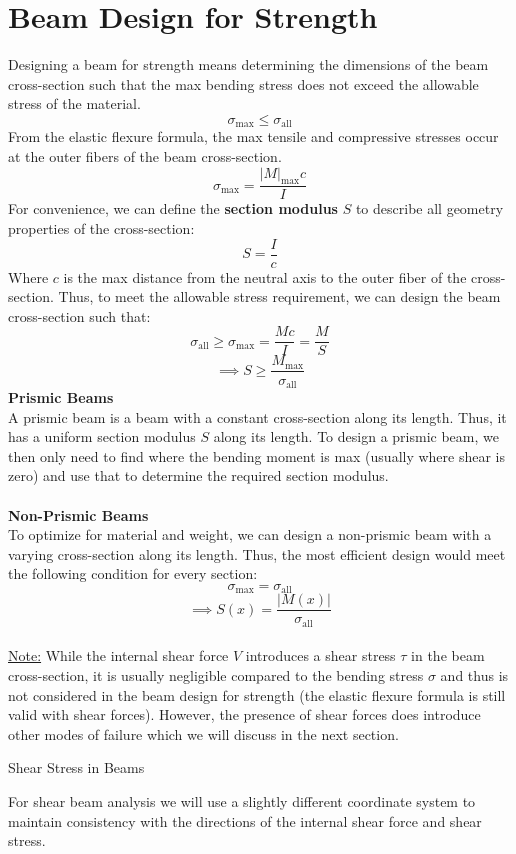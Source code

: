 \documentclass[12pt]{article}
\begin{document}
\section*{Beam Design for Strength}
Designing a beam for strength means determining the dimensions of the beam cross-section such that the max bending stress does not exceed the allowable stress of the material.
\[\sigma_\text{max}\leq\sigma_\text{all}\]
From the elastic flexure formula, the max tensile and compressive stresses occur at the outer fibers of the beam cross-section. 
\[\sigma_\text{max} = \frac{|M|_\text{max} c}{I}\]
For convenience, we can define the \textbf{section modulus} $S$ to describe all geometry properties of the cross-section:
\[\boxed{S = \frac{I}{c}}\]
Where $c$ is the max distance from the neutral axis to the outer fiber of the cross-section. Thus, to meet the allowable stress requirement, we can design the beam cross-section such that:
\[\sigma_\text{all} \geq \sigma_\text{max} = \frac{Mc}{I} = \frac{M}{S}\]
\[\implies S \geq \frac{M_\text{max}}{\sigma_\text{all}}\]
\textbf{Prismic Beams}\\
A prismic beam is a beam with a constant cross-section along its length. Thus, it has a uniform section modulus $S$ along its length. To design a prismic beam, we then only need to find where the bending moment is max (usually where shear is zero) and use that to determine the required section modulus.\\\\
\textbf{Non-Prismic Beams}\\
To optimize for material and weight, we can design a non-prismic beam with a varying cross-section along its length. Thus, the most efficient design would meet the following condition for every section:
\[\sigma_\text{max} = \sigma_{\text{all}}\]
\[\implies S(x) = \frac{|M(x)|}{\sigma_{\text{all}}}\]
\\
\underline{Note:} While the internal shear force $V$ introduces a shear stress $\tau$ in the beam cross-section, it is usually negligible compared to the bending stress $\sigma$ and thus is not considered in the beam design for strength (the elastic flexure formula is still valid with shear forces). However, the presence of shear forces does introduce other modes of failure which we will discuss in the next section.
\newpage
{\centering\LARGE Shear Stress in Beams\par}\noindent
For shear beam analysis we will use a slightly different coordinate system to maintain consistency with the directions of the internal shear force and shear stress.
\end{document}
